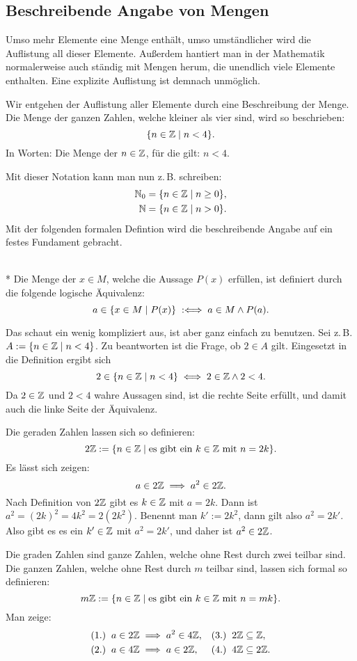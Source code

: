 \subsection{Beschreibende Angabe von Mengen}

Umso mehr Elemente eine Menge enthält, umso umständlicher wird
die Auflistung all dieser Elemente. Außerdem hantiert man in der
Mathematik normalerweise auch ständig mit Mengen herum, die
unendlich viele Elemente enthalten. Eine explizite Auflistung ist
demnach unmöglich.

Wir entgehen der Auflistung aller Elemente durch eine Beschreibung
der Menge. Die Menge der ganzen Zahlen, welche kleiner als vier sind,
wird so beschrieben:%
\[\{n\in\mathbb Z\mid n<4\}.\]
In Worten: Die Menge der $n\in\mathbb Z$, für die gilt: $n<4$.

Mit dieser Notation kann man nun z.\,B. schreiben:%
\begin{align*}
\mathbb N_0 &= \{n\in\mathbb Z\mid n\ge 0\},\\
\mathbb N &= \{n\in\mathbb Z\mid n>0\}.
\end{align*}
Mit der folgenden formalen Defintion wird die beschreibende Angabe
auf ein festes Fundament gebracht.

\begin{Definition}%
\label{def:set-builder-bounded}\mbox{}\\*
Die Menge der $x\in M$, welche die Aussage $P(x)$ erfüllen,
ist definiert durch die folgende logische Äquivalenz:%
\[a\in\{x\in M\mid P(x)\} \;:\Longleftrightarrow\; a\in M\land P(a).\]
\end{Definition}
Das schaut ein wenig kompliziert aus, ist aber ganz einfach zu
benutzen. Sei z.\,B. $A:=\{n\in\mathbb Z\mid n<4\}$. Zu beantworten ist
die Frage, ob $2\in A$ gilt. Eingesetzt in die Definition
ergibt sich%
\[2\in\{n\in\mathbb Z\mid n<4\}\iff 2\in\mathbb Z\land 2<4.\]
Da $2\in\mathbb Z$ und $2<4$ wahre Aussagen sind, ist die rechte Seite
erfüllt, und damit auch die linke Seite der Äquivalenz.

Die geraden Zahlen lassen sich so definieren:%
\[2\mathbb Z:=\{n\in\mathbb Z\mid\text{es gibt ein $k\in\mathbb Z$ mit $n=2k$}\}.\]
Es lässt sich zeigen:
\[a\in 2\mathbb Z\implies a^2\in 2\mathbb Z.\]
Nach Definition von $2\mathbb Z$ gibt es $k\in\mathbb Z$ mit $a=2k$.
Dann ist $a^2=(2k)^2=4k^2=2(2k^2)$. Benennt man $k':=2k^2$, dann
gilt also $a^2=2k'$. Also gibt es es ein $k'\in\mathbb Z$
mit $a^2=2k'$, und daher ist $a^2\in 2\mathbb Z$.

Die graden Zahlen sind ganze Zahlen, welche ohne Rest durch zwei teilbar
sind. Die ganzen Zahlen, welche ohne Rest durch $m$ teilbar sind,
lassen sich formal so definieren:%
\[m\mathbb Z:=\{n\in\mathbb Z\mid\text{es gibt ein $k\in\mathbb Z$ mit $n=mk$}\}.\]
Man zeige:
\begin{align*}
& (1.)\;\;a\in 2\mathbb Z\implies a^2\in 4\mathbb Z, && (3.)\;\;2\mathbb Z\subseteq\mathbb Z,\\
& (2.)\;\;a\in 4\mathbb Z\implies a\in 2\mathbb Z,   && (4.)\;\;4\mathbb Z\subseteq 2\mathbb Z.
\end{align*}


